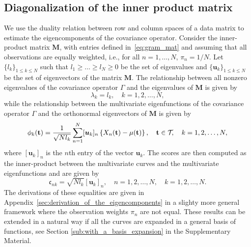 \subsection{Diagonalization of the inner product matrix} %
\label{sub:by_diagonalization_of_the_inner_product_matrix}

We use the duality relation between row and column spaces of a data matrix to estimate the eigencomponents of the covariance operator. Consider the inner-product matrix $\mathbf{M}$, with entries defined in~\eqref{eq:gram_mat} and assuming that all observations are equally weighted, i.e., for all $n = 1, \dots, N$, $\pi_n = 1/N$.
Let $\{l_k\}_{1 \leq k \leq N}$ such that $l_1 \geq \dots \geq l_N \geq 0$ be the set of eigenvalues and $\{\boldsymbol{u}_k\}_{1 \leq k \leq N}$ be the set of eigenvectors of the matrix $\mathbf{M}$. The relationship between all nonzero eigenvalues of the covariance operator $\Gamma$ and the eigenvalues of $\mathbf{M}$ is given by
\begin{equation}\label{eq:eigenvalues_relation_p}
    \lambda_k = l_k, \quad k = 1, 2, \dots, N,
\end{equation}
while the relationship between the multivariate eigenfunctions of the covariance operator $\Gamma$ and the orthonormal eigenvectors of $\mathbf{M}$ is given by
\begin{equation}\label{eq:eigenfunction_relation_p}
    \phi_k(\mathbf{t}) = \frac{1}{\sqrt{N l_k}}\sum_{n = 1}^N [\boldsymbol{u}_{k}]_n\left\{X_n(\mathbf{t}) - \mu(\mathbf{t})\right\}, \quad \mathbf{t} \in \mathcal{T}_{}, \quad k = 1, 2, \dots, N, 
\end{equation}
where $[\boldsymbol{u}_{k}]_n$ is the $n$th entry of the vector $\boldsymbol{u}_k$. The scores are then computed as the inner-product between the multivariate curves and the multivariate eigenfunctions and are given by
\begin{equation}\label{eq:scores_relation_p}
    \mathfrak{c}_{nk} = \sqrt{N l_k}[\boldsymbol{u}_{k}]_n, \quad n = 1, 2, \dots, N, \quad k = 1, 2, \dots, N. 
\end{equation}
The derivations of these equalities are given in Appendix~\ref{sec:derivation_of_the_eigencomponents} in a slighty more general framework where the observation weights $\pi_n$ are not equal. These results can be extended in a natural way if all the curves are expanded in a general basis of functions, see Section \ref{sub:with_a_basis_expansion} in the Supplementary Material.



